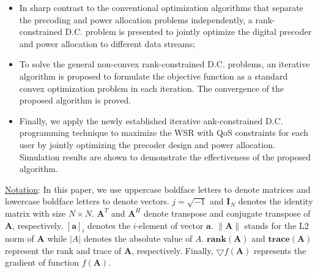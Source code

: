 \documentclass[10pt,journal,twocolumn,twoside]{IEEEtran}
\begin{document}
\begin{itemize}[leftmargin=*]
		
\item In sharp contrast to the conventional optimization algorithms that separate the precoding and power allocation problems independently, a rank-constrained D.C. problem is presented to jointly optimize the digital precoder and power allocation to different data streams;

\item To solve the general non-convex rank-constrained D.C. problems, an iterative algorithm is proposed to formulate the objective function as a standard convex optimization problem in each iteration. The convergence of the proposed algorithm is proved.

\item Finally, we apply the newly established iterative ank-constrained D.C. programming technique to maximize the WSR with QoS constraints for each user by jointly optimizing the precoder design and power allocation. Simulation results are shown to demonstrate the effectiveness of the proposed algorithm.

\end{itemize}


{\underline{Notation}: In this paper, we use uppercase boldface letters to denote matrices and lowercase boldface letters to denote vectors. $j = \sqrt{-1}$ and $\bm{I}_N$ denotes the identity matrix with size $N\times N$. ${\bm A}^T$ and ${\bm A}^H$ denote transpose and conjugate transpose of ${\bm A}$, respectively. $[\bm{a}]_{i}$ denotes the $i$-element of vector ${\bm a}$. $\|\bm{A}\| $ stands for the L2 norm of ${\bm A}$ while $|A|$ denotes the absolute value of $A$.  $\textbf{rank}(\bm{A})$ and $\textbf{trace}(\bm{A})$ represent the rank and trace of $\bm{A}$, respectively. Finally, $\bigtriangledown f(\bm{A})$ represents the gradient of function $f(\bm{A})$.}


\end{document}
